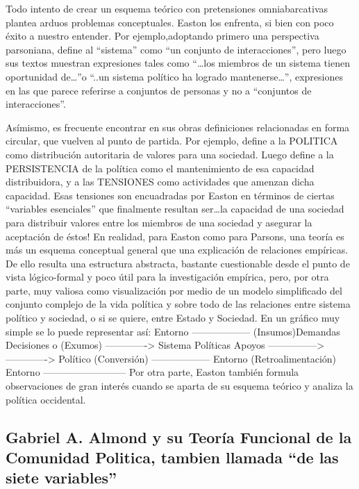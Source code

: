 \documentclass[
]{book}
\begin{document}
Todo intento de crear un esquema teórico con pretensiones omniabarcativas plantea arduos problemas conceptuales. Easton los enfrenta, si bien con poco éxito a nuestro entender. Por ejemplo,adoptando primero una perspectiva parsoniana, define al ``sistema'' como ``un conjunto de interacciones'', pero luego sus textos muestran expresiones tales como ``\ldots los miembros de un sistema tienen oportunidad de\ldots{}''o ``..un sistema político ha logrado mantenerse\ldots{}'', expresiones en las que parece referirse a conjuntos de personas y no a ``conjuntos de interacciones''.

Asímismo, es frecuente encontrar en sus obras definiciones relacionadas en forma circular, que vuelven al punto de partida. Por ejemplo, define a la POLITICA como distribución autoritaria de valores para una sociedad. Luego define a la PERSISTENCIA de la política como el mantenimiento de esa capacidad distribuidora, y a las TENSIONES como actividades que amenzan dicha capacidad. Esas tensiones son encuadradas por Easton en términos de ciertas ``variables esenciales'' que finalmente resultan ser\ldots la capacidad de una sociedad para distribuir valores entre los miembros de una sociedad y asegurar la aceptación de éstos! En realidad, para Easton como para Parsons, una teoría es más un esquema conceptual general que una explicación de relaciones empíricas. De ello resulta una estructura abstracta, bastante cuestionable desde el punto de vista lógico-formal y poco útil para la investigación empírica, pero, por otra parte, muy valiosa como visualización por medio de un modelo simplificado del conjunto complejo de la vida política y sobre todo de las relaciones entre sistema político y sociedad, o si se quiere, entre Estado y Sociedad. En un gráfico muy simple se lo puede representar así: Entorno ------------------ (Insumos)Demandas \textbar{} \textbar{} Decisiones o (Exumos) -------------\textgreater{} Sistema \textbar{} Políticas Apoyos ---------------\textgreater{} -------------\textgreater{} Político \textbar{} \textbar{} (Conversión) \textbar{} \textbar{} \textbar{} ------------------ \textbar{} Entorno \textbar{} (Retroalimentación) \textbar{} Entorno -------------------------- Por otra parte, Easton también formula observaciones de gran interés cuando se aparta de su esquema teórico y analiza la política occidental.

\hypertarget{gabriel-a.-almond-y-su-teoruxeda-funcional-de-la-comunidad-politica-tambien-llamada-de-las-siete-variables}{%
\subsection*{Gabriel A. Almond y su Teoría Funcional de la Comunidad Politica, tambien llamada ``de las siete variables''}\label{gabriel-a.-almond-y-su-teoruxeda-funcional-de-la-comunidad-politica-tambien-llamada-de-las-siete-variables}}
\end{document}
